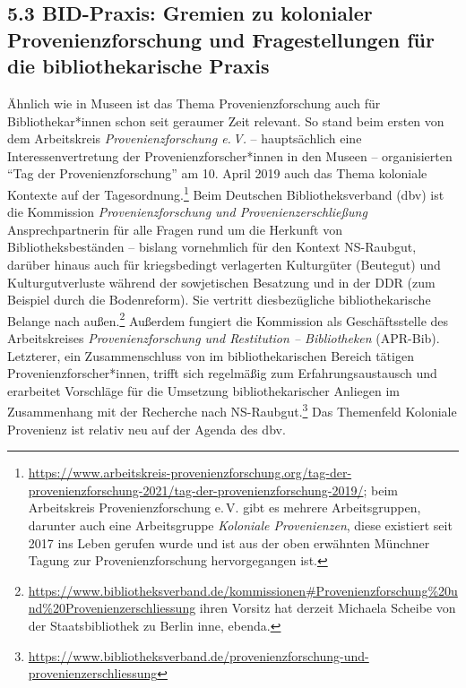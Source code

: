 \documentclass[a4paper,
fontsize=11pt,
oneside,
numbers=noperiodatend,
parskip=half-,
bibliography=totoc,
final
]{scrartcl}
\begin{document}
\hypertarget{bid-praxis-gremien-zu-kolonialer-provenienzforschung-und-fragestellungen-fuxfcr-die-bibliothekarische-praxis}{%
\subsection{5.3 BID-Praxis: Gremien zu kolonialer Provenienzforschung und
Fragestellungen für die bibliothekarische
Praxis}\label{bid-praxis-gremien-zu-kolonialer-provenienzforschung-und-fragestellungen-fuxfcr-die-bibliothekarische-praxis}}

Ähnlich wie in Museen ist das Thema Provenienzforschung auch für
Bibliothekar*innen schon seit geraumer Zeit relevant. So stand beim
ersten von dem Arbeitskreis \emph{Provenienzforschung e.\,V.} --
hauptsächlich eine Interessenvertretung der Provenienzforscher*innen in
den Museen -- organisierten \enquote{Tag der Provenienzforschung} am 10.
April 2019 auch das Thema koloniale Kontexte auf der
Tagesordnung.\footnote{\url{https://www.arbeitskreis-provenienzforschung.org/tag-der-provenienzforschung-2021/tag-der-provenienzforschung-2019/};
  beim Arbeitskreis Provenienzforschung e.\,V. gibt es mehrere
  Arbeitsgruppen, darunter auch eine Arbeitsgruppe \emph{Koloniale
  Provenienzen}, diese existiert seit 2017 ins Leben gerufen wurde und
  ist aus der oben erwähnten Münchner Tagung zur Provenienzforschung
  hervorgegangen ist.} Beim Deutschen Bibliotheksverband (dbv) ist die
Kommission \emph{Provenienzforschung und Provenienzerschließung}
Ansprechpartnerin für alle Fragen rund um die Herkunft von
Bibliotheksbeständen -- bislang vornehmlich für den Kontext NS-Raubgut,
darüber hinaus auch für kriegsbedingt verlagerten Kulturgüter (Beutegut)
und Kulturgutverluste während der sowjetischen Besatzung und in der DDR
(zum Beispiel durch die Bodenreform). Sie vertritt diesbezügliche
bibliothekarische Belange nach außen.\footnote{\url{https://www.bibliotheksverband.de/kommissionen\#Provenienzforschung\%20und\%20Provenienzerschliessung}
  ihren Vorsitz hat derzeit Michaela Scheibe von der Staatsbibliothek zu
  Berlin inne, ebenda.} Außerdem fungiert die Kommission als
Geschäftsstelle des Arbeitskreises \emph{Provenienzforschung und
Restitution -- Bibliotheken} (APR-Bib). Letzterer, ein Zusammenschluss
von im bibliothekarischen Bereich tätigen Provenienzforscher*innen,
trifft sich regelmäßig zum Erfahrungsaustausch und erarbeitet Vorschläge
für die Umsetzung bibliothekarischer Anliegen im Zusammenhang mit der
Recherche nach NS-Raubgut.\footnote{\url{https://www.bibliotheksverband.de/provenienzforschung-und-provenienzerschliessung}}
Das Themenfeld Koloniale Provenienz ist relativ neu auf der Agenda des
dbv.
\end{document}
